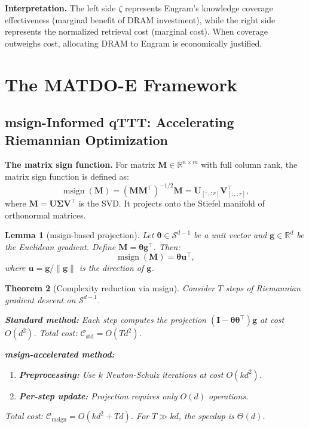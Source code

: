 \documentclass[11pt,a4paper]{article}
\theoremstyle{plain}
\newtheorem{theorem}{Theorem}[section]
\newtheorem{lemma}[theorem]{Lemma}
\theoremstyle{definition}
\DeclareMathOperator{\msign}{msign}
\begin{document}
\textbf{Interpretation.} The left side $\zeta$ represents Engram's knowledge coverage effectiveness (marginal benefit of DRAM investment), while the right side represents the normalized retrieval cost (marginal cost). When coverage outweighs cost, allocating DRAM to Engram is economically justified.

\section{The MATDO-E Framework}
\label{sec:method}

\subsection{msign-Informed qTTT: Accelerating Riemannian Optimization}
\label{sec:msign}

\textbf{The matrix sign function.} For matrix $\mathbf{M} \in \mathbb{R}^{n \times m}$ with full column rank, the matrix sign function is defined as:
\[
\msign(\mathbf{M}) = (\mathbf{M}\mathbf{M}^\top)^{-1/2}\mathbf{M} = \mathbf{U}_{[:,:r]}\mathbf{V}_{[:,:r]}^\top,
\]
where $\mathbf{M}=\mathbf{U}\boldsymbol{\Sigma}\mathbf{V}^\top$ is the SVD. It projects onto the Stiefel manifold of orthonormal matrices.

\begin{lemma}[msign-based projection]\label{lem:msign_proj}
Let $\boldsymbol{\theta} \in \mathcal{S}^{d-1}$ be a unit vector and $\mathbf{g} \in \mathbb{R}^d$ be the Euclidean gradient. Define $\mathbf{M} = \boldsymbol{\theta}\mathbf{g}^\top$. Then:
\[
\msign(\mathbf{M}) = \boldsymbol{\theta}\mathbf{u}^\top,
\]
where $\mathbf{u} = \mathbf{g}/\|\mathbf{g}\|$ is the direction of $\mathbf{g}$.
\end{lemma}

\begin{theorem}[Complexity reduction via msign]\label{thm:msign_complex}
Consider $T$ steps of Riemannian gradient descent on $\mathcal{S}^{d-1}$.

\textbf{Standard method:} Each step computes the projection $(\mathbf{I} - \boldsymbol{\theta}\boldsymbol{\theta}^\top)\mathbf{g}$ at cost $O(d^2)$. Total cost: $\mathcal{C}_{\text{std}} = O(Td^2)$.

\textbf{msign-accelerated method:} 
\begin{enumerate}
    \item \textbf{Preprocessing:} Use $k$ Newton-Schulz iterations at cost $O(kd^2)$.
    \item \textbf{Per-step update:} Projection requires only $O(d)$ operations.
\end{enumerate}
Total cost: $\mathcal{C}_{\text{msign}} = O(kd^2 + Td)$. For $T \gg kd$, the speedup is $\Theta(d)$.
\end{theorem}
\end{document}
